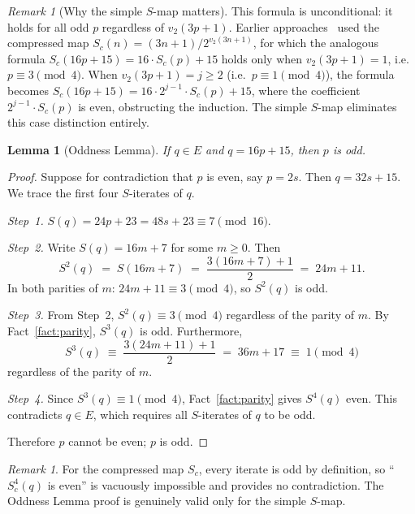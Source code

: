 \documentclass{amsart}
\newtheorem{lemma}[theorem]{Lemma}
\theoremstyle{definition}
\theoremstyle{remark}
\newtheorem{remark}[theorem]{Remark}
\newcommand{\vv}[1]{v_2\!\left(#1\right)}   %
\newcommand{\Sc}{S_c}                         %
\begin{document}
\begin{remark}[Why the simple $S$-map matters]
\label{rem:simplemap}
This formula is unconditional: it holds for all odd $p$ regardless of
$\vv{3p+1}$.
Earlier approaches~\cite{Wakil2025a,Wakil2025b,Wakil2025c} used the
compressed map $\Sc(n)=(3n+1)/2^{\vv{3n+1}}$, for which the analogous
formula $\Sc(16p+15)=16\cdot\Sc(p)+15$ holds only when $\vv{3p+1}=1$,
i.e.\ $p\equiv 3\pmod{4}$.
When $\vv{3p+1}=j\ge 2$ (i.e.\ $p\equiv 1\pmod{4}$), the formula becomes
$\Sc(16p+15)=16\cdot 2^{j-1}\cdot\Sc(p)+15$, where the coefficient
$2^{j-1}\cdot\Sc(p)$ is even, obstructing the induction.
The simple $S$-map eliminates this case distinction entirely.
\end{remark}

\begin{lemma}[Oddness Lemma]
\label{lem:oddness}
If $q\in E$ and $q=16p+15$, then $p$ is odd.
\end{lemma}

\begin{proof}
Suppose for contradiction that $p$ is even, say $p=2s$.
Then $q=32s+15$.
We trace the first four $S$-iterates of $q$.

\medskip
\noindent\textit{Step~1.}
$S(q)=24p+23=48s+23\equiv 7\pmod{16}$.

\medskip
\noindent\textit{Step~2.}
Write $S(q)=16m+7$ for some $m\ge 0$.
Then
\[
  S^2(q) \;=\; S(16m+7) \;=\; \frac{3(16m+7)+1}{2} \;=\; 24m+11.
\]
In both parities of $m$: $24m+11\equiv 3\pmod{4}$, so $S^2(q)$ is odd.

\medskip
\noindent\textit{Step~3.}
From Step~2, $S^2(q)\equiv 3\pmod{4}$ regardless of the parity of $m$.
By Fact~\ref{fact:parity}, $S^3(q)$ is odd.
Furthermore,
\[
  S^3(q) \;\equiv\; \frac{3(24m+11)+1}{2} \;=\; 36m+17 \;\equiv\; 1\pmod{4}
\]
regardless of the parity of $m$.

\medskip
\noindent\textit{Step~4.}
Since $S^3(q)\equiv 1\pmod{4}$, Fact~\ref{fact:parity} gives $S^4(q)$
even.
This contradicts $q\in E$, which requires all $S$-iterates of $q$ to be odd.

Therefore $p$ cannot be even; $p$ is odd.
\end{proof}

\begin{remark}
For the compressed map $\Sc$, every iterate is odd by definition, so
``$S_c^4(q)$ is even'' is vacuously impossible and provides no
contradiction.
The Oddness Lemma proof is genuinely valid only for the simple $S$-map.
\end{remark}
\end{document}
